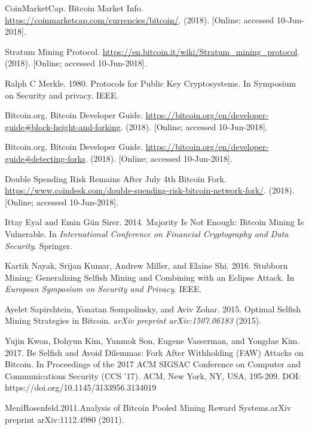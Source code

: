 \documentclass[a4paper, 11pt]{article}
\begin{document}
\begin{CJK*}{UTF8}{gbsn}
\begin{thebibliography}{8}
    CoinMarketCap. Bitcoin Market Info. 
    \url{https://coinmarketcap.com/currencies/bitcoin/}. 
    (2018). [Online; accessed 10-Jun-2018].


    Stratum Mining Protocol. 
    \url{https://en.bitcoin.it/wiki/Stratum_mining_protocol}.
    (2018). [Online; accessed 10-Jun-2018].
    
    
    Ralph C Merkle. 1980. Protocols for Public Key Cryptosystems. In Symposium on
    Security and privacy. IEEE.

    Bitcoin.org. Bitcoin Developer Guide. 
    \url{https://bitcoin.org/en/developer-guide#block-height-and-forking}.
    (2018). [Online; accessed 10-Jun-2018].


    Bitcoin.org. Bitcoin Developer Guide. 
    \url{https://bitcoin.org/en/developer-guide#detecting-forks}.
    (2018). [Online; accessed 10-Jun-2018].

    Double Spending Risk Remains After July 4th Bitcoin Fork.
    \url{https://www.coindesk.com/double-spending-risk-bitcoin-network-fork/}. 
    (2018). [Online; accessed 10-Jun-2018].

    Ittay Eyal and Emin Gün Sirer. 2014. Majority Is Not Enough: Bitcoin Mining
    Is Vulnerable. 
    In \textit{International Conference on Financial Cryptography and Data
    Security}. Springer.

    Kartik Nayak, Srijan Kumar, Andrew Miller, and Elaine Shi. 2016. Stubborn
    Mining: Generalizing Selfish Mining and Combining with an Eclipse Attack. 
    In \textit{European Symposium on Security and Privacy}. IEEE.

    Ayelet Sapirshtein, Yonatan Sompolinsky, and Aviv Zohar. 2015. Optimal Selfish
    Mining Strategies in Bitcoin.
    \textit{arXiv preprint arXiv:1507.06183} (2015).

    Yujin Kwon, Dohyun Kim, Yunmok Son, Eugene Vasserman, and Yongdae Kim. 2017. 
    Be Selfish and Avoid Dilemmas: Fork After Withholding (FAW) Attacks on Bitcoin. 
    In Proceedings of the 2017 ACM SIGSAC Conference on Computer and Communications Security (CCS '17). 
    ACM, New York, NY, USA, 195-209. DOI: https://doi.org/10.1145/3133956.3134019

    MeniRosenfeld.2011.Analysis of Bitcoin Pooled Mining Reward Systems.arXiv
    preprint arXiv:1112.4980 (2011).


\end{thebibliography}
\end{CJK*}
\end{document}
